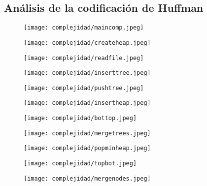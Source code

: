 \documentclass[12 pt]{report}
\begin{document}
\subsection{Análisis de la codificación de Huffman}
\begin{figure}[h!]
  \centering
  \texttt{[image: complejidad/maincomp.jpeg]}
  \caption{\label{fig:Main de la codificación}}
\end{figure}
\newpage
\begin{figure}[h!]
  \texttt{[image: complejidad/createheap.jpeg]}
  \caption{\label{fig:Reservar el espacio del montículo} }
\end{figure}
\begin{figure}[h!]
  \texttt{[image: complejidad/readfile.jpeg]}
  \caption{\label{fig:Leer bytes del archivo original}}
\end{figure}
\newpage
\begin{figure}[h!]
  \texttt{[image: complejidad/inserttree.jpeg]}
  \caption{\label{fig:Insertar nodos en la cola de prioridad} }
\end{figure}
\begin{figure}[h!]
  \texttt{[image: complejidad/pushtree.jpeg]}
  \caption{\label{fig:Insertar datos en los nodos} }
\end{figure}
\begin{figure}[h!]
  \texttt{[image: complejidad/insertheap.jpeg]}
  \caption{\label{fig:Insercion en la cola de prioridad} }
\end{figure}
\newpage
\begin{figure}[h!]
  \texttt{[image: complejidad/bottop.jpeg]}
  \caption{\label{fig:Hacer bottom top al montículo} }
\end{figure}
\begin{figure}[h!]
  \texttt{[image: complejidad/mergetrees.jpeg]}
  \caption{\label{fig:Unir todos los arboles en uno principal} }
\end{figure}
\begin{figure}[h!]
  \texttt{[image: complejidad/popminheap.jpeg]}
  \caption{\label{fig:Eliminar y devolver el menor elemento de la cola} }
\end{figure}
\newpage
\begin{figure}[h!]
  \texttt{[image: complejidad/topbot.jpeg]}
  \caption{\label{fig:Hacer top bottom al montículo} }
\end{figure}
\begin{figure}[h!]
  \texttt{[image: complejidad/mergenodes.jpeg]}
  \caption{\label{fig:Unir dos nodos a un ancestro comun} }
\end{figure}
\end{document}
